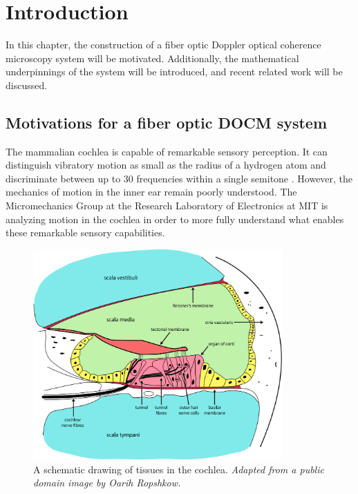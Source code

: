 \chapter{Introduction}

In this chapter, the construction of a fiber optic Doppler optical coherence microscopy system will be motivated. Additionally, the mathematical underpinnings of the system will be introduced, and recent related work will be discussed.

\section{Motivations for a fiber optic DOCM system}

\label{sec:intro}

The mammalian cochlea is capable of remarkable sensory perception. It can distinguish vibratory motion as small as the radius of a hydrogen atom and discriminate between up to 30 frequencies within a single semitone \cite{ghafarri}. However, the mechanics of motion in the inner ear remain poorly understood. The Micromechanics Group at the Research Laboratory of Electronics at MIT is analyzing motion in the cochlea in order to more fully understand what enables these remarkable sensory capabilities.

\begin{figure}[h!]
  \centering
    \includegraphics[width=0.85\textwidth]{Images/Background/cochlea_big.png}
      \caption[A schematic drawing of tissues in the cochlea.]{A schematic drawing of tissues in the cochlea. {\em Adapted from a public domain image by Oarih Ropshkow.}}
      \label{fig:cochlea}
\end{figure}

